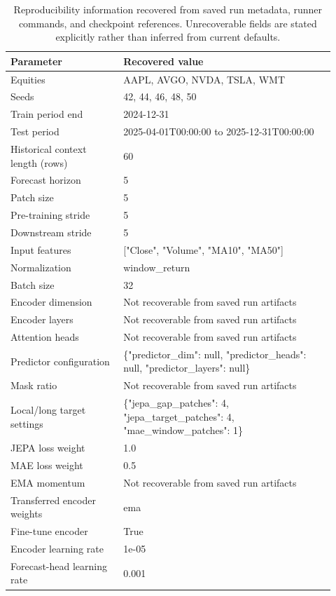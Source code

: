 \begin{table}[p]
\centering
\small
\caption{Reproducibility information recovered from saved run metadata, runner commands, and checkpoint references. Unrecoverable fields are stated explicitly rather than inferred from current defaults.}
\label{tab:reproducibility}
\begin{tabular}{p{0.32\linewidth}p{0.60\linewidth}}
\toprule
Parameter & Recovered value \\
\midrule
Equities & AAPL, AVGO, NVDA, TSLA, WMT \\
Seeds & 42, 44, 46, 48, 50 \\
Train period end & 2024-12-31 \\
Test period & 2025-04-01T00:00:00 to 2025-12-31T00:00:00 \\
Historical context length (rows) & 60 \\
Forecast horizon & 5 \\
Patch size & 5 \\
Pre-training stride & 5 \\
Downstream stride & 5 \\
Input features & ["Close", "Volume", "MA10", "MA50"] \\
Normalization & window\_return \\
Batch size & 32 \\
Encoder dimension & Not recoverable from saved run artifacts \\
Encoder layers & Not recoverable from saved run artifacts \\
Attention heads & Not recoverable from saved run artifacts \\
Predictor configuration & \{"predictor\_dim": null, "predictor\_heads": null, "predictor\_layers": null\} \\
Mask ratio & Not recoverable from saved run artifacts \\
Local/long target settings & \{"jepa\_gap\_patches": 4, "jepa\_target\_patches": 4, "mae\_window\_patches": 1\} \\
JEPA loss weight & 1.0 \\
MAE loss weight & 0.5 \\
EMA momentum & Not recoverable from saved run artifacts \\
Transferred encoder weights & ema \\
Fine-tune encoder & True \\
Encoder learning rate & 1e-05 \\
Forecast-head learning rate & 0.001 \\

\end{tabular}
\end{table}
